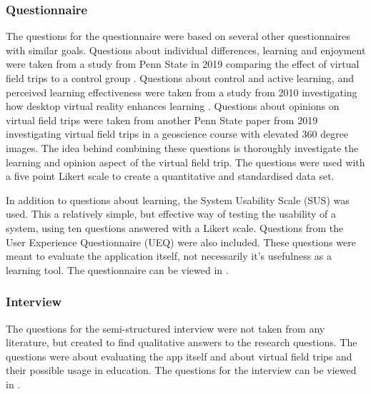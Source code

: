     \subsubsection{Questionnaire}
        The questions for the questionnaire were based on several other questionnaires with similar goals. Questions about individual differences, learning and enjoyment were taken from a study from Penn State in 2019 comparing the effect of virtual field trips to a control group \cite{transforming_earth_science}. Questions about control and active learning, and perceived learning effectiveness were taken from a study from 2010 investigating how desktop virtual reality enhances learning \cite{desktop_virtual_reality}. Questions about opinions on virtual field trips were taken from another Penn State paper from 2019 investigating virtual field trips in a geoscience course with elevated 360 degree images. The idea behind combining these questions is thoroughly investigate the learning and opinion aspect of the virtual field trip. The questions were used with a five point Likert scale \cite{likert} to create a quantitative and standardised data set.
        
        In addition to questions about learning, the System Usability Scale (SUS) \cite{sus} was used. This a relatively simple, but effective way of testing the usability of a system, using ten questions answered with a Likert scale. Questions from the User Experience Questionnaire (UEQ) \cite{ueq_questionnaire} were also included. These questions were meant to evaluate the application itself, not necessarily it's usefulness as a learning tool. The questionnaire can be viewed in .
        
    
    \subsubsection{Interview}
        The questions for the semi-structured interview were not taken from any literature, but created to find qualitative answers to the research questions. The questions were about evaluating the app itself and about virtual field trips and their possible usage in education. The questions for the interview can be viewed in .

